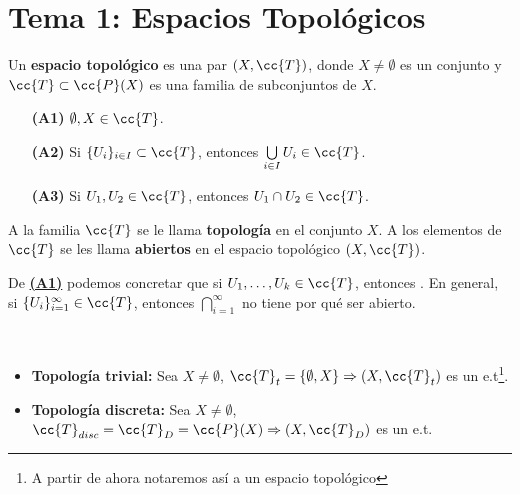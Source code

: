 
\chapter{Tema 1: Espacios Topológicos}

Un \textbf{espacio topológico} es una par $(X, \cc{T})$, donde $X \neq \emptyset$ es un conjunto y $\cc{T}\subset\cc{P}(X)$ es una familia de subconjuntos de $X$.

\begin{enumerate}
    \item[\textbf{(\hypertarget{A1}{A1})}] $\emptyset, X \in \cc{T}$.
    \item[\textbf{(\hypertarget{A2}{A2})}] Si $\{U_i\}_{i\in I} \subset \cc{T}$, entonces $\bigcup\limits_{i\in I} U_i \in \cc{T}$.
    \item[\textbf{(\hypertarget{A3}{A3})}] Si $U_1, U_2 \in \cc{T}$, entonces $U_1 \cap U_2 \in \cc{T}$.
\end{enumerate}

A la familia $\cc{T}$ se le llama \textbf{topología} en el conjunto $X$. A los elementos de $\cc{T}$ se les llama \textbf{abiertos} en el espacio topológico $(X, \cc{T})$.

\vspace*{0.5cm}

\begin{observacion}
    De \hyperlink{A1}{\textbf{(A1)}} podemos concretar que si $U_1, \dots, U_k \in \cc{T}$, entonces .
    En general, si $\{U_i\}_{i=1}^{\infty}\in \cc{T}$, entonces $\bigcap\limits_{i=1}^{\infty}$ no tiene por qué ser abierto.
\end{observacion}

\begin{ejemplo}\ 
    \begin{itemize}
        \item \textbf{Topología trivial:} Sea $X \neq \emptyset$, $\cc{T}_t = \{\emptyset, X\} \Rightarrow (X, \cc{T}_t)$ es un e.t\footnote{A partir de ahora notaremos así a un espacio topológico}.
        \item \textbf{Topología discreta:} Sea $X \neq \emptyset$, $\cc{T}_{disc}= \cc{T}_{D} = \cc{P}(X) \Rightarrow (X, \cc{T}_D)$ es un e.t.
    \end{itemize}
\end{ejemplo}
